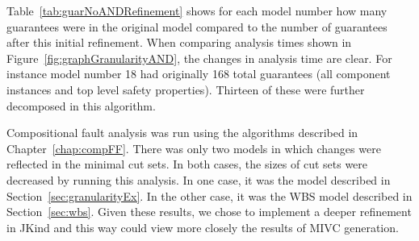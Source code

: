 Table~\ref{tab:guarNoANDRefinement} shows for each model number how many guarantees were in the original model compared to the number of guarantees after this initial refinement. When comparing analysis times shown in Figure~\ref{fig:graphGranularityAND}, the changes in analysis time are clear. For instance model number 18 had originally 168 total guarantees (all component instances and top level safety properties). Thirteen of these were further decomposed in this algorithm.  

Compositional fault analysis was run using the algorithms described in Chapter~\ref{chap:compFF}. There was only two models in which changes were reflected in the minimal cut sets. In both cases, the sizes of cut sets were decreased by running this analysis. In one case, it was the model described in Section~\ref{sec:granularityEx}. In the other case, it was the WBS model described in Section~\ref{sec:wbs}. Given these results, we chose to implement a deeper refinement in JKind and this way could view more closely the results of MIVC generation. 
